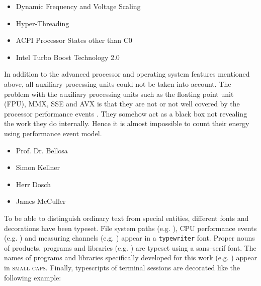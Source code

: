 \begin{itemize}

\item Dynamic Frequency and Voltage Scaling \cite{wiki:DVFS}

\item Hyper-Threading \cite{wiki:HT}

\item ACPI Processor States other than C0 \cite{wiki:ACPI}

\item Intel\TReg{} Turbo Boost Technology 2.0 \cite{wiki:IntelTurboBoost}

\end{itemize}

In addition to the advanced processor and operating system features mentioned
above, all auxiliary processing units could not be taken into account. The
problem with the auxiliary processing units such as the floating point unit
(FPU), MMX\cite{wiki:MMX}, SSE\cite{wiki:SSE} and AVX\cite{wiki:AVX} is that
they are not or not well covered by the processor performance events
\cite{intel2011events}. They somehow act as a black box not revealing the
work they do internally. Hence it is almost impossible to count their energy
using performance event model.


\begin{itemize}

\item Prof. Dr. Bellosa

\item Simon Kellner

\item Herr Dosch

\item James McCuller

\end{itemize}


\label{sec:preliminaries}

To be able to distinguish ordinary text from special entities, different fonts
and decorations have been typeset. File system paths (e.g. ),
CPU performance events (e.g. \JWctrCLK{}) and measuring channels (e.g.
) appear in a \texttt{typewriter} font. Proper nouns of
products, programs and libraries (e.g. \JWTleaps{}) are typeset using a
\textsf{sans--serif} font. The names of programs and libraries specifically
developed for this work (e.g. \JWTdd{}) appear in \textsc{small caps}. Finally,
typescripts of terminal sessions are decorated like the following example:

